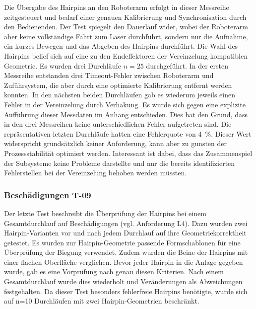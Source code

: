 Die Übergabe des Hairpins an den Roboterarm erfolgt in dieser Messreihe zeitgesteuert und bedarf einer genauen Kalibrierung und
Synchronisation durch den Bedienenden. Der Test spiegelt den Dauerlauf wider, wobei der Roboterarm aber keine vollständige
Fahrt zum Laser durchführt, sondern nur die Aufnahme, ein kurzes Bewegen und das Abgeben des Hairpins durchführt.
Die Wahl des Hairpins belief sich auf eine zu den Endeffektoren der Vereinzelung kompatiblen Geometrie.
Es wurden drei Durchläufe $n = 25$ durchgeführt. In der ersten Messreihe entstanden drei Timeout-Fehler zwischen Roboterarm und
Zuführsystem, die aber durch eine optimierte Kalibrierung entfernt werden konnten. In den nächsten beiden Durchläufen
gab es wiederum jeweils einen Fehler in der Vereinzelung durch Verhakung. Es wurde sich gegen eine explizite Aufführung 
dieser Messdaten im Anhang entschieden. Dies hat den Grund, dass in den drei Messreihen keine unterschiedlichen Fehler
aufgetreten sind. Die repräsentativen letzten Durchläufe hatten eine Fehlerquote von \qty{4}{\percent}. Dieser Wert
widerspricht grundsätzlich keiner Anforderung, kann aber zu gunsten der Prozessstabilität optimiert werden. Interessant
ist dabei, dass das Zusammenspiel der Subsysteme keine Probleme darstellte und nur die bereits identifizierten
Fehlerstellen bei der Vereinzelung behoben werden müssten.

\subsubsection{Beschädigungen T-09}\label{sec:VR_Beschädigung}
Der letzte Test beschreibt die Überprüfung der Hairpins bei einem Gesamtdurchlauf auf Beschädigungen (vgl. Anforderung L4).
Dazu wurden zwei Hairpin-Varianten vor und nach jedem Durchlauf auf ihre Geometriekorrektheit getestet. Es wurden zur Hairpin-Geometrie
passende Formschablonen für eine Überprüfung der Biegung verwendet. Zudem wurden die Beine der Hairpins mit einer flachen Oberfläche
verglichen. Bevor jeder Hairpin in die Anlage gegeben wurde, gab es eine Vorprüfung nach genau diesen Kriterien. Nach einem Gesamtdurchlauf
wurde dies wiederholt und Veränderungen als Abweichungen festgehalten. Da dieser Test besonders fehlerfreie Hairpins benötigte, wurde
sich auf n=10 Durchläufen mit zwei Hairpin-Geometrien beschränkt.

